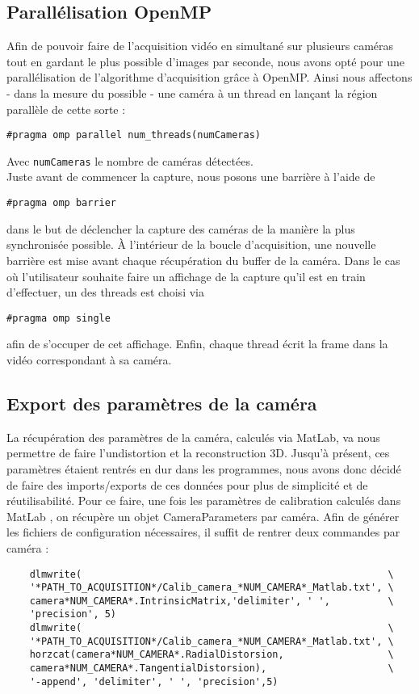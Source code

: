 \subsection{Parallélisation OpenMP}
Afin de pouvoir faire de l'acquisition vidéo en simultané sur plusieurs caméras tout en gardant le plus possible d'images par seconde, nous avons opté pour une parallélisation de l'algorithme d'acquisition grâce à OpenMP. Ainsi nous affectons - dans la mesure du possible - une caméra à un thread en lançant la région parallèle de cette sorte :
\begin{verbatim}
#pragma omp parallel num_threads(numCameras)
\end{verbatim}
Avec \texttt{numCameras} le nombre de caméras détectées. \\
Juste avant de commencer la capture, nous posons une barrière à l'aide de 
\begin{verbatim}
#pragma omp barrier
\end{verbatim}
dans le but de déclencher la capture des caméras de la manière la plus synchronisée possible.
À l'intérieur de la boucle d'acquisition, une nouvelle barrière est mise avant chaque récupération du buffer de la caméra.
Dans le cas où l'utilisateur souhaite faire un affichage de la capture qu'il est en train d'effectuer, un des threads est choisi via
\begin{verbatim}
#pragma omp single
\end{verbatim}
afin de s'occuper de cet affichage.
Enfin, chaque thread écrit la frame dans la vidéo correspondant à sa caméra.

\subsection{Export des paramètres de la caméra}

La récupération des paramètres de la caméra, calculés via MatLab, va nous permettre de faire l'undistortion et la reconstruction 3D. Jusqu'à présent, ces paramètres étaient rentrés en dur dans les programmes, nous avons donc décidé de faire des imports/exports de ces données pour plus de simplicité et de ré\-u\-ti\-li\-sa\-bi\-li\-té.
Pour ce faire, une fois les paramètres de calibration calculés dans MatLab , on récupère un objet CameraParameters par caméra. Afin de générer les fichiers de configuration nécessaires, il suffit de rentrer deux commandes par caméra :

\begin{verbatim}
	dlmwrite( 													  \
	'*PATH_TO_ACQUISITION*/Calib_camera_*NUM_CAMERA*_Matlab.txt', \
	camera*NUM_CAMERA*.IntrinsicMatrix,'delimiter', ' ',		  \
	'precision', 5)
	dlmwrite(													  \
	'*PATH_TO_ACQUISITION*/Calib_camera_*NUM_CAMERA*_Matlab.txt', \
	horzcat(camera*NUM_CAMERA*.RadialDistorsion,				  \
	camera*NUM_CAMERA*.TangentialDistorsion),					  \
	'-append', 'delimiter', ' ', 'precision',5)
\end{verbatim}

